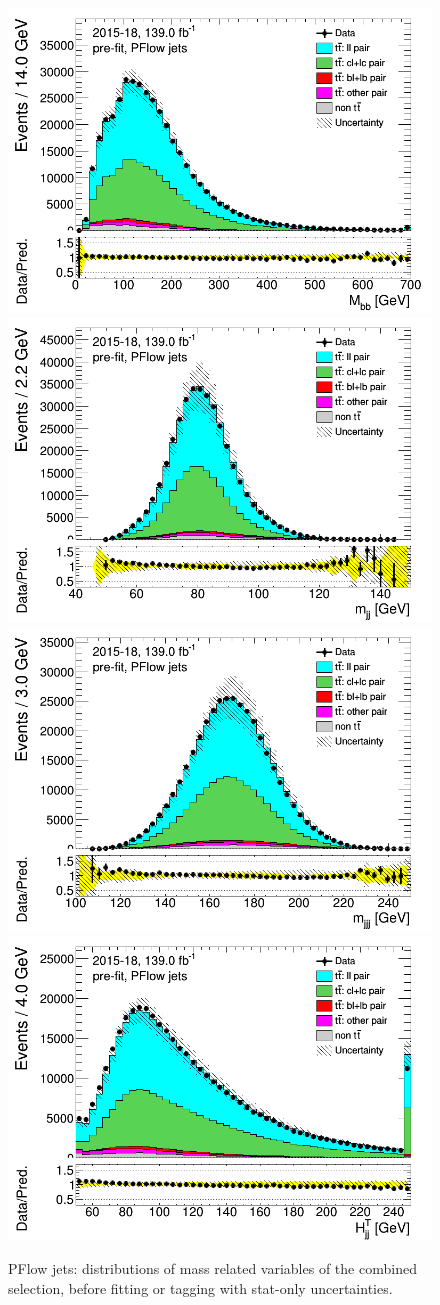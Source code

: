 \documentclass[letterpaper,12pt]{article}
\begin{document}
	\newpage
	\begin{figure}[H]
	\includegraphics[width=.45\textwidth]{FTAG_plots/pretagNoRwwithhighpTPFlowall/DataMC_h_Mbb.png}
	\includegraphics[width=.45\textwidth]{FTAG_plots/pretagNoRwwithhighpTPFlowall/DataMC_h_mjj.png}\\
	\includegraphics[width=.45\textwidth]{FTAG_plots/pretagNoRwwithhighpTPFlowall/DataMC_h_mjjj.png}
	\includegraphics[width=.45\textwidth]{FTAG_plots/pretagNoRwwithhighpTPFlowall/DataMC_h_Htjj.png}\\
	\caption{PFlow jets: distributions of mass related variables of the combined selection, 
	before fitting or 
	tagging with stat-only uncertainties.} \label{fig:combined_mass_PFlow}
	\end{figure}
	
\end{document}
